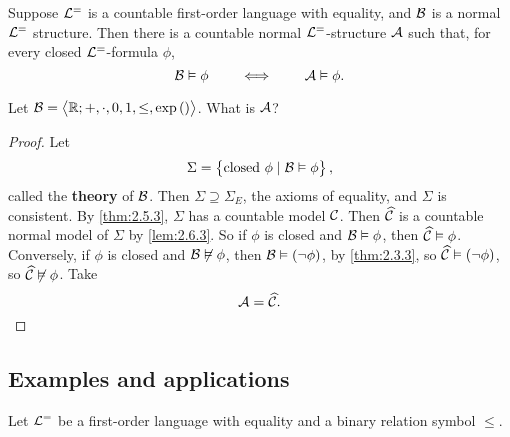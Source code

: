 
\begin{theorem}
\label{thm:2.6.6}
Suppose $ \LL^= $ is a countable first-order language with equality, and $ \BB $ is a normal $ \LL^= $ structure. Then there is a countable normal $ \LL^= $-structure $ \AA $ such that, for every closed $ \LL^= $-formula $ \phi $,
$$ \BB \vDash \phi \qquad \iff \qquad \AA \vDash \phi. $$
\end{theorem}

\begin{example*}
Let $ \BB = \abr{\R; +, \cdot, 0, 1, \le, \exp\br{}} $. What is $ \AA $?
\end{example*}

\begin{proof}
Let
$$ \Sigma = \cbr{\text{closed} \ \phi \mid \BB \vDash \phi}, $$
called the \textbf{theory} of $ \BB $. Then $ \Sigma \supseteq \Sigma_E $, the axioms of equality, and $ \Sigma $ is consistent. By \ref{thm:2.5.3}, $ \Sigma $ has a countable model $ \CC $. Then $ \widehat{\CC} $ is a countable normal model of $ \Sigma $ by \ref{lem:2.6.3}. So if $ \phi $ is closed and $ \BB \vDash \phi $, then $ \widehat{\CC} \vDash \phi $. Conversely, if $ \phi $ is closed and $ \BB \not\vDash \phi $, then $ \BB \vDash \notb{\phi} $, by \ref{thm:2.3.3}, so $ \widehat{\CC} \vDash \notb{\phi} $, so $ \widehat{\CC} \not\vDash \phi $. Take
$$ \AA = \widehat{\CC}. $$
\end{proof}

\subsection{Examples and applications}

Let $ \LL^= $ be a first-order language with equality and a binary relation symbol $ \le $.

